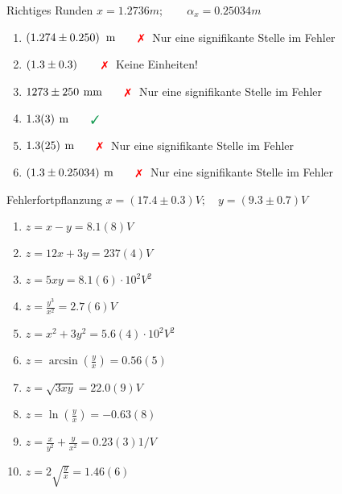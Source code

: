 \documentclass{alex_gp}
\begin{document}
\renewcommand{\labelenumi}{\alph{enumi})}


\begin{mybox}{Richtiges Runden}
	\centering \( x = 1.2736 \unit{m};\qquad \alpha_x = 0.25034 \unit{m} \)
	\tcblower
	\begin{enumerate}
		\item \( \left(1.274 \pm 0.250 \right) \unit{m} \qquad \xmark \)  Nur eine signifikante Stelle im Fehler
	\tcbline*
		\item \( \left(1.3 \pm 0.3 \right) \qquad \xmark \)  Keine Einheiten!
	\tcbline*
		\item \( 1273 \pm 250 \unit{mm} \qquad \xmark \)  Nur eine signifikante Stelle im Fehler
	\tcbline*
		\item \( 1.3(3) \unit{m} \qquad \cmark \)
	\tcbline*
		\item \( 1.3(25) \unit{m} \qquad \xmark \)  Nur eine signifikante Stelle im Fehler
	\tcbline*
		\item \(  (1.3 \pm 0.25034) \unit{m} \qquad \xmark \)  Nur eine signifikante Stelle im Fehler
	\end{enumerate}
\end{mybox}

\begin{mybox}{Fehlerfortpflanzung}
	\centering \( x = (17.4 \pm 0.3) \unit{V};\quad y = (9.3 \pm 0.7) \unit{V} \)
	\tcblower
	\begin{enumerate}
		\item \( z = x - y = 8.1(8) \unit{V} \)
	\tcbline*
		\item \( z = 12x + 3y = 237(4) \unit{V} \)
	\tcbline*
		\item \( z = 5xy = 8.1(6) \cdot 10^{2} \unit{V^2} \)
	\tcbline*
		\item \( z = \tfrac{y^3}{x^2} = 2.7(6) \unit{V} \)
	\tcbline*
		\item \( z = x^2 + 3y^2 = 5.6(4) \cdot 10^{2} \unit{V^2}\)
	\tcbline*
		\item \( z = \arcsin(\tfrac{y}{x}) = 0.56(5) \)
	\tcbline*
		\item \( z = \sqrt{3xy} = 22.0(9) \unit{V} \)
	\tcbline*
		\item \( z = \ln(\tfrac{y}{x}) = -0.63(8) \)
	\tcbline*
		\item \( z = \tfrac{x}{y^2} + \tfrac{y}{x^2} = 0.23(3) \unit{1/V} \)
	\tcbline*
		\item \( z = 2\sqrt{\tfrac{y}{x}} = 1.46(6) \)
	\end{enumerate}
\end{mybox}
\end{document}

